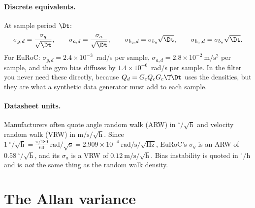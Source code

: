 \paragraph{Discrete equivalents.} At sample period $\Dt$:
\begin{equation}
  \sigma_{g,d} = \frac{\sigma_g}{\sqrt\Dt}, \qquad \sigma_{a,d} = \frac{\sigma_a}{\sqrt\Dt}, \qquad
  \sigma_{b_g,d} = \sigma_{b_g}\sqrt\Dt, \qquad \sigma_{b_a,d} = \sigma_{b_a}\sqrt\Dt .
\end{equation}
For EuRoC: $\sigma_{g,d} = 2.4\times10^{-3}$~rad/s per sample, $\sigma_{a,d} = 2.8\times10^{-2}~\mathrm{m/s^2}$ per sample,
and the gyro bias diffuses by $1.4\times10^{-6}$~rad/s per sample. In the filter you never need these
directly, because $Q_d = G_cQ_cG_c\T\Dt$ uses the densities, but they are what a synthetic data generator must
add to each sample.

\paragraph{Datasheet units.} Manufacturers often quote angle random walk (ARW) in
$^\circ/\sqrt{\mathrm{h}}$ and velocity random walk (VRW) in $\mathrm{m/s/\sqrt{h}}$. Since
$1\ ^\circ/\sqrt{\mathrm{h}} = \frac{\pi/180}{60}~\mathrm{rad/\sqrt{s}} = 2.909\times10^{-4}~\mathrm{rad/s/\sqrt{Hz}}$, EuRoC's
$\sigma_g$ is an ARW of $0.58\ ^\circ/\sqrt{\mathrm{h}}$, and its $\sigma_a$ is a VRW of $0.12~\mathrm{m/s/\sqrt{h}}$.
Bias instability is quoted in $^\circ/\mathrm{h}$ and is \emph{not} the same thing as the random walk density.

\section{The Allan variance}
\label{sec:allan}

